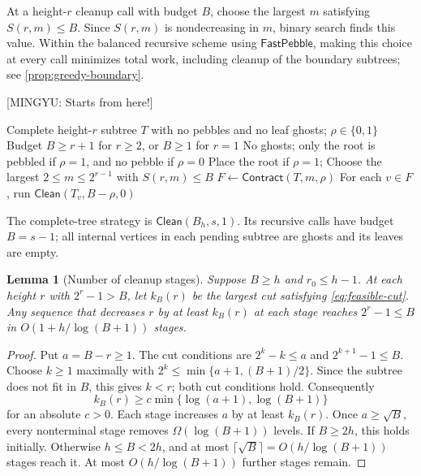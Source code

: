\documentclass[11pt]{article}
\newtheorem{lemma}[lemma]{Lemma}
\theoremstyle{definition}
\theoremstyle{remark}
\newcommand{\Fast}{\mathsf{FastPebble}}
\newcommand{\Clean}{\mathsf{Clean}}
\newcommand{\Contract}{\mathsf{Contract}}
\newcommand{\mingyu}[1]{{\color{magenta}\footnotesize [MINGYU: #1]}} %
\begin{document}
At a height-$r$ cleanup call with budget $B$, choose the largest $m$ satisfying $S(r,m)\le B$. Since $S(r,m)$ is nondecreasing in $m$, binary search finds this value. Within the balanced recursive scheme using $\Fast$, making this choice at every call minimizes total work, including cleanup of the boundary subtrees; see \cref{prop:greedy-boundary}.

\mingyu{Starts from here!}

\begin{algorithm}[H]
\caption{Complete-tree block cleanup $\Clean(T,B,\rho)$}
\label{alg:seq-clean}
\begin{algorithmic}[1]
\Require Complete height-$r$ subtree $T$ with no pebbles and no leaf ghosts; $\rho\in\{0,1\}$
\Require Budget $B\ge r+1$ for $r\ge2$, or $B\ge1$ for $r=1$
\Ensure No ghosts; only the root is pebbled if $\rho=1$, and no pebble if $\rho=0$
 \State Place the root if $\rho=1$; \Return
\EndIf
\State Choose the largest $2\le m\le2^{r-1}$ with $S(r,m)\le B$
\State $F\gets\Contract(T,m,\rho)$
\State For each $v\in F$, run $\Clean(T_v,B-\rho,0)$
\end{algorithmic}
\end{algorithm}

The complete-tree strategy is $\Clean(B_h,s,1)$. Its recursive calls have budget $B=s-1$; all internal vertices in each pending subtree are ghosts and its leaves are empty.

\begin{lemma}[Number of cleanup stages]
\label{lem:slack}
Suppose $B\ge h$ and $r_0\le h-1$. At each height $r$ with $2^r-1>B$, let $k_B(r)$ be the largest cut satisfying \cref{eq:feasible-cut}. Any sequence that decreases $r$ by at least $k_B(r)$ at each stage reaches $2^r-1\le B$ in $O(1+h/\log(B+1))$ stages.
\end{lemma}
\begin{proof}
Put $a=B-r\ge1$. The cut conditions are $2^k-k\le a$ and $2^{k+1}-1\le B$. Choose $k\ge1$ maximally with
$2^k\le\min\{a+1,(B+1)/2\}$. Since the subtree does not fit in $B$, this gives $k<r$; both cut conditions hold. Consequently
\[
 k_B(r)\ge c\min\{\log(a+1),\log(B+1)\}
\]
for an absolute $c>0$. Each stage increases $a$ by at least $k_B(r)$. Once $a\ge\sqrt B$, every nonterminal stage removes $\Omega(\log(B+1))$ levels. If $B\ge2h$, this holds initially. Otherwise $h\le B<2h$, and at most $\lceil\sqrt B\rceil=O(h/\log(B+1))$ stages reach it. At most $O(h/\log(B+1))$ further stages remain.
\end{proof}
\end{document}
